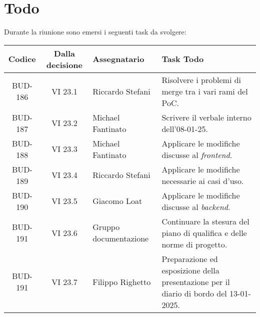 
\section{Todo}

Durante la riunione sono emersi i seguenti task da svolgere:

\vspace{0.5cm}

\begin{table}[htbp]
\centering
{}
\begin{tabular}{|c|c|p{}|p{}|}
    \hline
    \rowcolor[gray]{0.75}
    \textbf{Codice} & \textbf{Dalla decisione} & \textbf{Assegnatario} & \textbf{Task Todo} \\
    \hline
    BUD-186 & VI 23.1 & Riccardo Stefani & Risolvere i problemi di merge tra i vari rami del PoC. \\
    \hline
    BUD-187 & VI 23.2 & Michael Fantinato & Scrivere il verbale interno dell'08-01-25. \\
    \hline
    BUD-188 & VI 23.3 & Michael Fantinato & Applicare le modifiche discusse al \emph{frontend}. \\
    \hline
    BUD-189 & VI 23.4 & Riccardo Stefani & Applicare le modifiche necessarie ai casi d'uso. \\
    \hline
    BUD-190 & VI 23.5 & Giacomo Loat & Applicare le modifiche discusse al \emph{backend}. \\
    \hline
    BUD-191 & VI 23.6 & Gruppo documentazione & Continuare la stesura del piano di qualifica e delle norme di progetto. \\
    \hline
    BUD-191 & VI 23.7 & Filippo Righetto & Preparazione ed esposizione della presentazione per il diario di bordo del 13-01-2025. \\
    \hline
\end{tabular}
\end{table}
